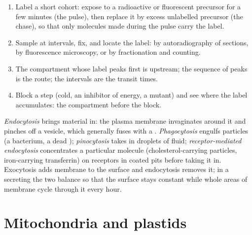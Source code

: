 \begin{method}\label{met:b1:eukaryotic-cell:pulsechase}
\begin{enumerate}
  \item Label a short cohort: expose  to a radioactive or
        fluorescent precursor for a few minutes (the pulse), then
        replace it by excess unlabelled precursor (the chase), so that
        only molecules made during the pulse carry the label.
  \item Sample at intervals, fix, and locate the label: by
        autoradiography of sections, by fluorescence microscopy, or by
        fractionation and counting.
  \item The compartment whose label peaks first is upstream; the
        sequence of peaks is the route; the intervals are the transit
        times.
  \item Block a step (cold, an inhibitor of energy, a mutant) and see
        where the label accumulates: the compartment before the block.
\end{enumerate}
\end{method}

\begin{definition}[Endocytosis]\label{def:b1:eukaryotic-cell:endocytosis}
\emph{Endocytosis} brings material in: the plasma
membrane invaginates around it and pinches off a vesicle, which
generally fuses with a . \emph{Phagocytosis} engulfs particles
(a bacterium, a dead ); \emph{pinocytosis} takes in droplets of
fluid; \emph{receptor-mediated endocytosis} concentrates a particular
molecule (cholesterol-carrying particles, iron-carrying transferrin) on
receptors in coated pits before taking it in. Exocytosis adds membrane
to the  surface and endocytosis removes it; in a secreting  the
two balance so that the surface stays constant while whole areas of
membrane cycle through it every hour.
\end{definition}

\section{Mitochondria and plastids}

